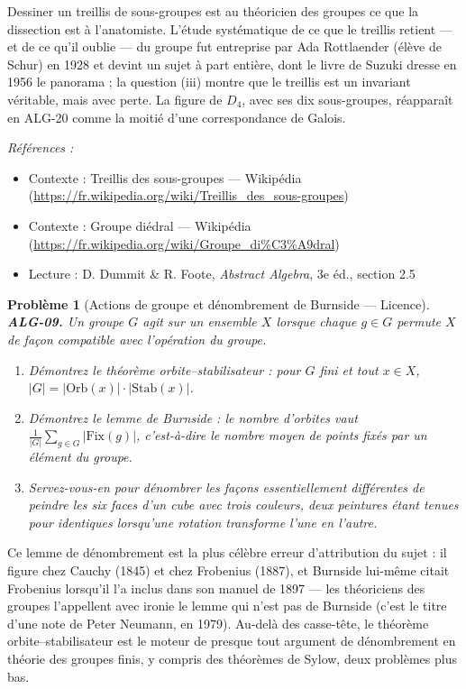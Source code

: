 \documentclass[11pt]{article}
\newtheorem{problem}{Problème}
\newenvironment{refs}{\par\small\noindent\emph{Références :}\begin{itemize}\setlength\itemsep{0pt}}{\end{itemize}\normalsize}
\begin{document}
\noindent Dessiner un treillis de sous-groupes est au théoricien des groupes ce que la dissection est
à l'anatomiste. L'étude systématique de ce que le treillis retient --- et de ce qu'il oublie --- du groupe fut
entreprise par Ada Rottlaender (élève de Schur) en 1928 et devint un sujet à part entière, dont le livre de
Suzuki dresse en 1956 le panorama ; la question (iii) montre que le treillis est un invariant véritable, mais
avec perte. La figure de $D_4$, avec ses dix sous-groupes, réapparaît en ALG-20 comme la moitié d'une
correspondance de Galois.

\begin{refs}
\item Contexte : Treillis des sous-groupes --- Wikipédia (\url{https://fr.wikipedia.org/wiki/Treillis_des_sous-groupes})
\item Contexte : Groupe diédral --- Wikipédia (\url{https://fr.wikipedia.org/wiki/Groupe_di%C3%A9dral})
\item Lecture : D. Dummit \& R. Foote, \textit{Abstract Algebra}, 3e éd., section 2.5
\end{refs}

\bigskip

\begin{problem}[{Actions de groupe et dénombrement de Burnside --- Licence}]
\textbf{ALG-09.} Un groupe $G$ \textit{agit} sur un ensemble $X$ lorsque chaque
$g \in G$ permute $X$ de façon compatible avec l'opération du groupe.
\begin{enumerate}
\item[(i)] Démontrez le théorème orbite--stabilisateur
: pour $G$ fini et tout $x \in X$, $|G| = |\mathrm{Orb}(x)| \cdot |\mathrm{Stab}(x)|$.
\item[(ii)] Démontrez le lemme de Burnside : le nombre d'orbites vaut
$\frac{1}{|G|} \sum_{g \in G} |\mathrm{Fix}(g)|$, c'est-à-dire le nombre moyen de points fixés par un
élément du groupe.
\item[(iii)] Servez-vous-en pour dénombrer les façons essentiellement différentes de peindre les six faces d'un
cube avec trois couleurs, deux peintures étant tenues pour identiques lorsqu'une rotation transforme l'une en
l'autre.
\end{enumerate}

\end{problem}

\noindent Ce lemme de dénombrement est la plus célèbre erreur d'attribution du sujet : il figure chez
Cauchy (1845) et chez Frobenius (1887), et Burnside lui-même citait Frobenius lorsqu'il l'a inclus dans son
manuel de 1897 --- les théoriciens des groupes l'appellent avec ironie \og{} le lemme qui n'est pas de Burnside \fg{}
(c'est le titre d'une note de Peter Neumann, en 1979). Au-delà des casse-tête, le théorème
orbite--stabilisateur est le moteur de presque tout argument de dénombrement en théorie des groupes finis, y
compris des théorèmes de Sylow, deux problèmes plus bas.
\end{document}
